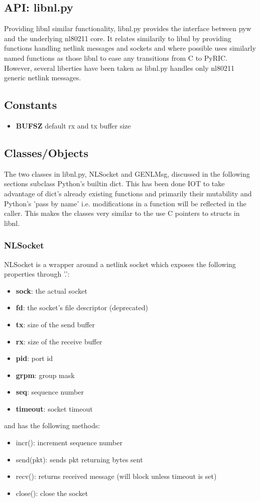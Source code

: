 \documentclass[11pt]{article}
\begin{document}
\begin{appendices}
\section{API: libnl.py}\label{sec:libnlapi}
Providing libnl similar functionality, libnl.py provides the interface between
pyw and the underlying nl80211 core. It relates similarily to libnl by providing
functions handling netlink messages and sockets and where possible uses similarly
named functions as those libnl to ease any transitions from C to PyRIC. However,
several liberties have been taken as libnl.py handles only nl80211 generic netlink
messages.

\subsection{Constants}
\begin{itemize}
\item \textbf{BUFSZ} default rx and tx buffer size
\end{itemize}

\subsection{Classes/Objects}
The two classes in libnl.py, NLSocket and GENLMsg, discussed in the following 
sections subclass Python's builtin dict. This has been done IOT to take advantage 
of dict's already existing functions and primarily their mutability and Python's
'pass by name' i.e. modifications in a function will be reflected in the caller.
This makes the classes very similar to the use C pointers to structs in libnl.

\subsubsection{NLSocket}
NLSocket is a wrapper around a netlink socket which exposes the following 
properties through '.':
\begin{itemize}
\item \textbf{sock}: the actual socket
\item \textbf{fd}: the socket's file descriptor (deprecated)
\item \textbf{tx}: size of the send buffer
\item \textbf{rx}: size of the receive buffer
\item \textbf{pid}: port id
\item \textbf{grpm}: group mask 
\item \textbf{seq}: sequence number
\item \textbf{timeout}: socket timeout
\end{itemize}
and has the following methods:
\begin{itemize}
\item incr(): increment sequence number
\item send(pkt): sends pkt returning bytes sent
\item recv(): returns received message (will block unless timeout is set)
\item close(): close the socket
\end{itemize}


\end{appendices}
\end{document}
